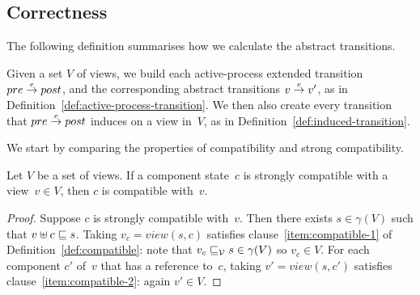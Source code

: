 






\subsection{Correctness}
\label{sec:views-correctness}


The following definition summarises how we calculate the abstract transitions.

\begin{definition}
\label{def:abstract-transition}
Given a set $V$ of views, we build each active-process extended transition
$pre \stackrel{e}\rightarrow post$, and the corresponding abstract transitions $v \stackrel{e}\rightarrow
v'$, as in Definition~\ref{def:active-process-transition}.
%
We then also create every transition that $pre \stackrel{e}\rightarrow post$ induces on a
view in~$V$, as in Definition~\ref{def:induced-transition}. 
\end{definition}

We start by comparing the properties of compatibility and strong compatibility.
%
\begin{lemma}
\label{lem:strong-compatible-implies-compatible}
Let $V$ be a set of views.
If a component state~$c$ is strongly compatible with a view~$v \in V$, then
$c$ is compatible with~$v$. 
\end{lemma}
%
\begin{proof}
Suppose $c$ is strongly compatible with~$v$.  Then there exists $s \in
\gamma(V)$ such that $v \uplus c \sqsubseteq s$.  Taking $v_c = view(s, c)$
satisfies clause~\ref{item:compatible-1} of Definition~\ref{def:compatible}:
note that $v_c \sqsubseteq_{\mathcal{V}} s \in \gamma(V)$ so $v_c \in V$.  For each component
$c'$ of~$v$ that has a reference to~$c$, taking $v' = view(s,c')$ satisfies
clause~\ref{item:compatible-2}: again $v' \in V$.
\end{proof}

